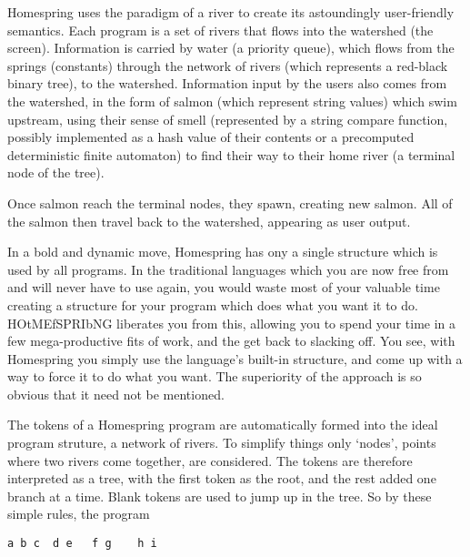 \documentclass[10pt]{article}
\begin{document}

Homespring uses the paradigm of a river to create its astoundingly user-friendly semantics. Each program is a set of rivers that flows into the watershed (the screen). Information is carried by water (a priority queue), which flows from the springs (constants) through the network of rivers (which represents a red-black binary tree), to the watershed. Information input by the users also comes from the watershed, in the form of salmon (which represent string values) which swim upstream, using their sense of smell (represented by a string compare function, possibly implemented as a hash value of their contents or a precomputed deterministic finite automaton) to find their way to their home river (a terminal node of the tree).


Once salmon reach the terminal nodes, they spawn, creating new salmon. All of the salmon then travel back to the watershed, appearing as user output. 



In a bold and dynamic move, Homespring has ony a single structure which is used by all programs. In the traditional languages which you are now free from and will never have to use again, you would waste most of your valuable time creating a structure for your program which does what you want it to do. HOtMEfSPRIbNG liberates you from this, allowing you to spend your time in a few mega-productive fits of work, and the get back to slacking off. You see, with Homespring you simply use the language's built-in structure, and come up with a way to force it to do what you want. The superiority of the approach is so obvious that it need not be mentioned.


The tokens of a Homespring program are automatically formed into the ideal program struture, a network of rivers. To simplify things only `nodes', points where two rivers come together, are considered. The tokens are therefore interpreted as a tree, with the first token as the root, and the rest added one branch at a time. Blank tokens are used to jump up in the tree. So by these simple rules, the program

\begin{verbatim}
a b c  d e   f g    h i
\end{verbatim}
\end{document}
